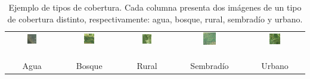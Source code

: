 \begin{table}
\begin{tabular}{ ccccc }
            \includegraphics[width=0.2\textwidth]{images/tipos/Ad.png}& \includegraphics[width=0.2\textwidth]{images/tipos/Bd.png}& \includegraphics[width=0.2\textwidth]{images/tipos/Rd.png}& \includegraphics[width=0.2\textwidth]{images/tipos/Pd.png}& \includegraphics[width=0.2\textwidth]{images/tipos/Ud.png}\\
            &&&&\\
            &&&&\\
            &&&&\\
            Agua & Bosque & Rural & Sembradío & Urbano \\
            
        \end{tabular}
        \caption{Ejemplo de tipos de cobertura. Cada columna presenta dos imágenes de un tipo de cobertura distinto, respectivamente: agua, bosque, rural, sembradío y urbano.}
        \label{fig:types}
    \end{table}
    
    
